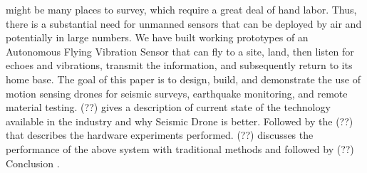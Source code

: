 might be many places to survey, which require a great deal
of hand labor. Thus, there is a substantial need for unmanned
sensors that can be deployed by air and potentially in large
numbers. We have built working prototypes of an Autonomous
Flying Vibration Sensor that can fly to a site, land, then
listen for echoes and vibrations, transmit the information, and
subsequently return to its home base.
The goal of this paper is to design, build, and demonstrate
the use of motion sensing drones for seismic surveys, earthquake monitoring, and remote material testing. (??) gives a
description of current state of the technology available in the
industry and why Seismic Drone is better. Followed by the
(??) that describes the hardware experiments performed. (??)
discusses the performance of the above system with traditional methods and followed by (??) Conclusion .

